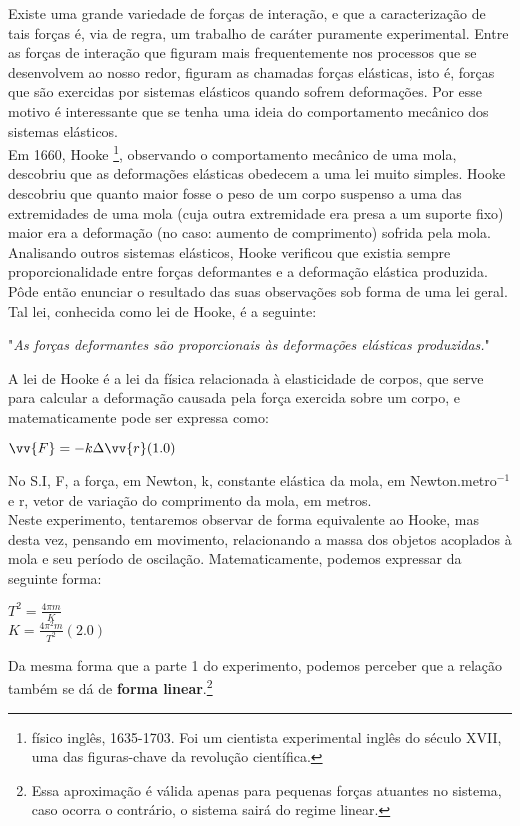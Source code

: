 \documentclass[11pt, article]{abntex2}
\begin{document}
Existe uma grande variedade de forças de interação, e que a caracterização de tais forças é, via de regra, um trabalho de caráter puramente experimental. Entre as forças de interação que figuram mais frequentemente nos processos que se desenvolvem ao nosso redor, figuram as chamadas forças elásticas, isto é, forças que são exercidas por sistemas elásticos quando sofrem deformações. Por esse motivo é interessante que se tenha uma ideia do comportamento mecânico dos sistemas elásticos.\\
Em 1660, Hooke \footnote{físico inglês, 1635-1703. Foi um cientista experimental inglês do século XVII, uma das figuras-chave da revolução científica.}, observando o comportamento mecânico de uma mola, descobriu que as deformações elásticas obedecem a uma lei muito simples. Hooke descobriu que quanto maior fosse o peso de um corpo suspenso a uma das extremidades de uma mola (cuja outra extremidade era presa a um suporte fixo) maior era a deformação (no caso: aumento de comprimento) sofrida pela mola. Analisando outros sistemas elásticos, Hooke verificou que existia sempre proporcionalidade entre forças deformantes e a deformação elástica produzida. Pôde então enunciar o resultado das suas observações sob forma de uma lei geral. Tal lei, conhecida como lei de Hooke, é a seguinte: 
\begin{center}
    "\textit{As forças deformantes são proporcionais às deformações elásticas produzidas.}"
\end{center}
A lei de Hooke é a lei da física relacionada à elasticidade de corpos, que serve para calcular a deformação causada pela força exercida sobre um corpo, e matematicamente pode ser expressa como: \\
\begin{center}
    \textbf{$\vv{F} = -k\Delta\vv{r} (1.0)$}                        
\end{center}
No S.I, F, a força, em Newton, k, constante elástica da mola, em Newton.metro$^{-1}$ e r, vetor de variação do comprimento da mola, em metros. \\
Neste experimento, tentaremos observar de forma equivalente ao Hooke, mas desta vez, pensando em movimento, relacionando a massa dos objetos acoplados à mola e seu período de oscilação. Matematicamente, podemos expressar da seguinte forma: 
\begin{center}
    \textbf{$ T^{2} = \frac{4\pi m}{K}$ \\
            $  K = \frac{4 \pi^{2}m}{T^{2}} (2.0)$ }
\end{center}
Da mesma forma que a parte 1 do experimento, podemos perceber que a relação também se dá de \textbf{forma linear}.\footnote{Essa aproximação é válida apenas para pequenas forças atuantes no sistema, caso ocorra o contrário, o sistema sairá do regime linear.} \\
\end{document}

